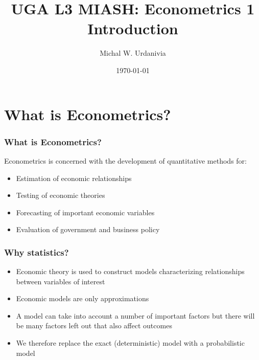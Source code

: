

\title[Econometrics 1: Introduction]{UGA L3 MIASH: Econometrics 1\\ \textbf{Introduction}}
\date{\today}
\author{Michal W. Urdanivia\inst{*}}




\frame{\titlepage}

\begin{frame}
  \tableofcontents  
\end{frame}

\section{What is Econometrics?}


\begin{frame}[allowframebreaks]\frametitle{What is Econometrics?}
  Econometrics is concerned with the development of quantitative
  methods for:
  \begin{itemize}
  \item Estimation of economic relationships
  \item Testing of economic theories
  \item Forecasting of important economic variables
  \item Evaluation of government and business policy
  \end{itemize}
\end{frame}

\begin{frame}[allowframebreaks]\frametitle{Why statistics?}
  \begin{itemize}
  \item Economic theory is used to construct models characterizing
    relationships between variables of interest
  \item Economic models are only approximations 
  \item A model can take into account a number of important factors
    but there will be many factors left out that also affect
    outcomes
  \item We therefore replace the exact (deterministic) model with a
    probabilistic model
  \end{itemize}
\end{frame}

